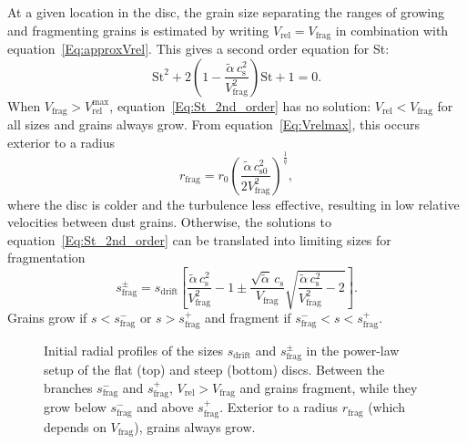 \documentclass[a4paper,fleqn,usenatbib]{mnras}
\newcommand{\Vrel}{V_\mathrm{rel}}    %
\newcommand{\Vfrag}{V_\mathrm{frag}}  %
\newcommand{\St}{\mathrm{St}}         %
\begin{document}
At a given location in the disc, the grain size separating the ranges of growing and fragmenting grains is estimated by writing $\Vrel=\Vfrag$ in combination with equation~\ref{Eq:approxVrel}. This gives a second order equation for St:
\begin{equation}
\St^2+2\left(1-\frac{\tilde{\alpha}\,c_\mathrm{s}^2}{\Vfrag^2}\right)\St+1=0.
\label{Eq:St_2nd_order}
\end{equation}
When $\Vfrag>\Vrel^\mathrm{max}$, equation~\ref{Eq:St_2nd_order} has no solution: $\Vrel<\Vfrag$ for all sizes and grains always grow. From equation~\ref{Eq:Vrelmax}, this occurs exterior to a radius
\begin{equation}
r_\mathrm{frag}=r_0\left(\frac{\tilde{\alpha}\,c_\mathrm{s0}^2}{2\Vfrag^2}\right)^\frac{1}{q},
\label{Eq:r_frag}
\end{equation}
where the disc is colder and the turbulence less effective, resulting in low relative velocities between dust grains.
Otherwise, the solutions to equation~\ref{Eq:St_2nd_order} can be translated into limiting sizes for fragmentation
\begin{equation}
s_\mathrm{frag}^\pm =s_\mathrm{drift}\left[\frac{\tilde{\alpha}\,c_\mathrm{s}^2}{\Vfrag^2}-1\pm\frac{\sqrt{\tilde{\alpha}}\,c_\mathrm{s}}{\Vfrag}\sqrt{\frac{\tilde{\alpha}\,c_\mathrm{s}^2}{\Vfrag^2}-2}\right].
\label{Eq:s_frag}
\end{equation}
Grains grow if $s<s_\mathrm{frag}^-$ or $s>s_\mathrm{frag}^+$ and fragment if $s_\mathrm{frag}^-<s<s_\mathrm{frag}^+$.

\begin{figure}
\centering
{}
\caption{Initial radial profiles of the sizes $s_\mathrm{drift}$ and $s_\mathrm{frag}^\pm$ in the power-law setup of the flat (top) and steep (bottom) discs. Between the branches $s_\mathrm{frag}^-$ and $s_\mathrm{frag}^+$, $\Vrel>\Vfrag$ and grains fragment, while they grow below $s_\mathrm{frag}^-$ and above $s_\mathrm{frag}^+$. Exterior to a radius $r_\mathrm{frag}$ (which depends on $\Vfrag$), grains always grow.}
\label{Fig:sfrag}
\end{figure}
\end{document}
